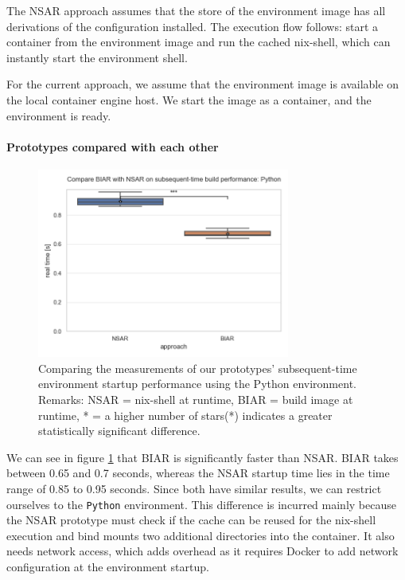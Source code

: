 The NSAR approach assumes that the store of the environment image has all derivations of the configuration installed. The execution flow follows: start a container from the environment image and run the cached nix-shell, which can instantly start the environment shell.

For the current approach, we assume that the environment image is available on the local container engine host. We start the image as a container, and the environment is ready. 
\paragraph{Prototypes compared with each other}
\begin{figure}[h!]
  \centering
  \includegraphics[width=0.74\textwidth]{thesis/graphics/compare-plots/compare_biar_with_nsar_on_subsequent-time_build_performance:_python.png}
  \caption{Comparing the measurements of our prototypes' subsequent-time environment startup performance using the Python environment. Remarks: NSAR = nix-shell at runtime, BIAR = build image at runtime, * = a higher number of stars(*) indicates a greater statistically significant difference.}
  \label{fig:nsar-biar-subsequent-time-build-python}
\end{figure}
We can see in figure \ref{fig:nsar-biar-subsequent-time-build-python} that BIAR is significantly faster than NSAR. BIAR takes between 0.65 and 0.7 seconds, whereas the NSAR startup time lies in the time range of 0.85 to 0.95 seconds. Since both have similar results, we can restrict ourselves to the \verb|Python| environment. This difference is incurred mainly because the NSAR prototype must check if the cache can be reused for the nix-shell execution and bind mounts two additional directories into the container. It also needs network access, which adds overhead as it requires Docker to add network configuration at the environment startup. 

